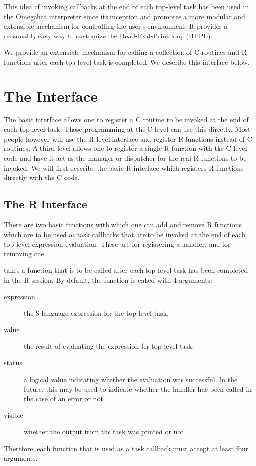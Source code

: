 \documentclass{article}
\begin{document}
This idea of invoking callbacks at the end of each top-level task has
been used in the Omegahat interpreter since its inception and promotes
a more modular and extensible mechanism for controlling the user's
environment.  It provides a reasonably easy way to customize the
Read-Eval-Print loop (REPL).

We provide an extensible mechanism for calling a collection of C
routines and R functions after each top-level task is completed.  We
describe this interface below.

\section{The Interface}
The basic interface allows one to register a C routine to be invoked
at the end of each top-level task.  Those programming at the C-level
can use this directly. Most people however will use the R-level
interface and register R functions instead of C routines.  A third
level allows one to register a single R function with the C-level code
and have it act as the manager or dispatcher for the real R functions
to be invoked.  We will first describe the basic R interface which
registers R functions directly with the C code.

\subsection{The R Interface}
There are two basic functions with which one can add and remove R
functions which are to be used as task callbacks that are to be
invoked at the end of each top-level expression evaluation.  These are
 for registering a handler, and
 for removing one.

 takes a function that is to be called
after each top-level task has been completed in the R session.  By
default, the function is called with $4$ arguments:
\begin{description}
\item[expression]
the S-language expression for the top-level task.
\item[value]
the result of evaluating the
expression for top-level task.
\item[status]
a logical value indicating whether the
evaluation was successful.
In the future, this may be used
to indicate whether the handler has been called
in the case of an error or not.
\item[visible]
whether the output from the task was printed or not.
\end{description}    
Therefore, each function that is used as a task callback must accept
at least four arguments.
\end{document}
